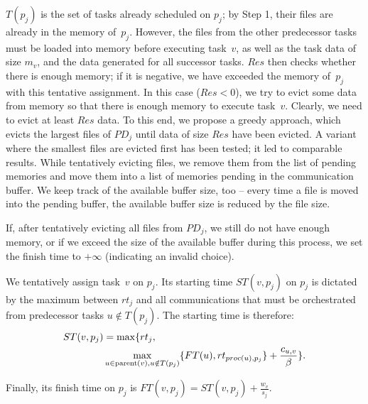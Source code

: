 \documentclass[conference]{IEEEtran}
\newcommand{\PD}{PD}
\newcommand{\AB}[1]{\todo[inline]{{\color{purple}[AB: #1]}}}
\begin{document}
$T(p_j)$ is the set of tasks already scheduled on $p_j$; by Step 1, their files are
already in the memory of~$p_j$. However, the files from the
other predecessor tasks must be loaded into memory before executing task~$v$,
as well as the task data of size $m_v$, and the data generated for all successor tasks.
$Res$ then checks whether there is enough memory; if it is negative,
we have exceeded the memory of~$p_j$ with this tentative assignment.
%
In this case ($Res <0$), we try to evict some data from memory so that there is enough memory to execute task~$v$.
Clearly, we need to evict at least $Res$ data.
To this end, we propose a greedy approach, which evicts the largest files of $\PD_j$ until data of size $Res$ have been evicted. 
A variant where the smallest files are evicted first has been tested; it led to comparable results. 
%    
While tentatively evicting files, we remove them from the list of pending memories and move them into a list
of memories pending in the communication buffer.
We keep track of the available buffer size, too -- every time a file is moved into the pending buffer, 
the available buffer size is reduced by the file size.

If, after tentatively evicting all files from $\PD_j$, we still do not have enough memory, or if we exceed the size of the available buffer during this process, we set the finish time to $+\infty$ (indicating an invalid choice).


\smallskip
{} We tentatively assign task~$v$ on $p_j$.
Its starting time $ST(v, p_j)$ on $p_j$ is dictated by the maximum between $rt_j$ and all communications that
must be orchestrated from predecessor tasks $u\notin T(p_j)$.
The starting time is therefore:\\[-.7cm]

{\small{ \begin{align*}
ST(v, p_j) & = \max  \large\{rt_j,  \\
& \max_{ u \in \parent(v), u\notin T(p_j)}\{ FT(u) , rt_{proc(u), p_j}\} + \frac{c_{u,v}}{\beta} \Large\} . 
\end{align*}
}}

\noindent  Finally, its finish time on $p_j$ is 
$FT(v,p_j) = ST(v, p_j) + \frac{w_v}{s_j}$.
\end{document}
